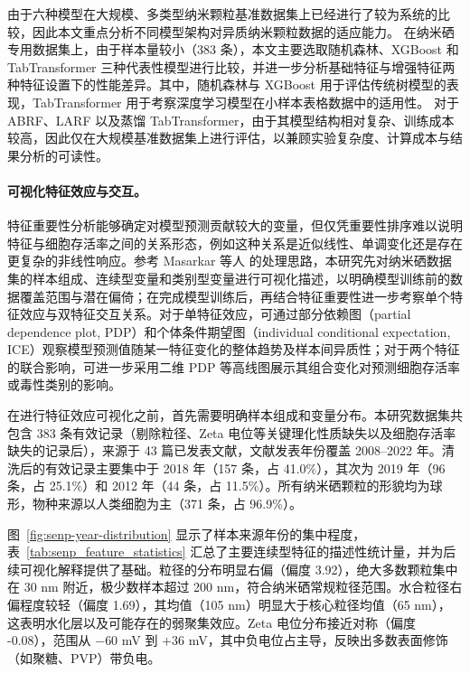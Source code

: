 由于六种模型在大规模、多类型纳米颗粒基准数据集上已经进行了较为系统的比较，因此本文重点分析不同模型架构对异质纳米颗粒数据的适应能力。
在纳米硒专用数据集上，由于样本量较小（383 条），本文主要选取随机森林、XGBoost 和 TabTransformer 三种代表性模型进行比较，并进一步分析基础特征与增强特征两种特征设置下的性能差异。其中，随机森林与 XGBoost 用于评估传统树模型的表现，TabTransformer 用于考察深度学习模型在小样本表格数据中的适用性。
对于 ABRF、LARF 以及蒸馏 TabTransformer，由于其模型结构相对复杂、训练成本较高，因此仅在大规模基准数据集上进行评估，以兼顾实验复杂度、计算成本与结果分析的可读性。

\paragraph{可视化特征效应与交互。}
特征重要性分析能够确定对模型预测贡献较大的变量，但仅凭重要性排序难以说明特征与细胞存活率之间的关系形态，例如这种关系是近似线性、单调变化还是存在更复杂的非线性响应。参考 Masarkar 等人 \cite{masarkar2024} 的处理思路，本研究先对纳米硒数据集的样本组成、连续型变量和类别型变量进行可视化描述，以明确模型训练前的数据覆盖范围与潜在偏倚；在完成模型训练后，再结合特征重要性进一步考察单个特征效应与双特征交互关系。对于单特征效应，可通过部分依赖图（partial dependence plot, PDP）和个体条件期望图（individual conditional expectation, ICE）观察模型预测值随某一特征变化的整体趋势及样本间异质性；对于两个特征的联合影响，可进一步采用二维 PDP 等高线图展示其组合变化对预测细胞存活率或毒性类别的影响。

在进行特征效应可视化之前，首先需要明确样本组成和变量分布。本研究数据集共包含 383 条有效记录（剔除粒径、Zeta 电位等关键理化性质缺失以及细胞存活率缺失的记录后），来源于 43 篇已发表文献，文献发表年份覆盖 2008--2022 年。清洗后的有效记录主要集中于 2018 年（157 条，占 41.0\%），其次为 2019 年（96 条，占 25.1\%）和 2012 年（44 条，占 11.5\%）。所有纳米硒颗粒的形貌均为球形，物种来源以人类细胞为主（371 条，占 96.9\%）。

图~\ref{fig:senp-year-distribution} 显示了样本来源年份的集中程度，表~\ref{tab:senp_feature_statistics} 汇总了主要连续型特征的描述性统计量，并为后续可视化解释提供了基础。粒径的分布明显右偏（偏度 3.92），绝大多数颗粒集中在 30 nm 附近，极少数样本超过 200 nm，符合纳米硒常规粒径范围。水合粒径右偏程度较轻（偏度 1.69），其均值（105 nm）明显大于核心粒径均值（65 nm），这表明水化层以及可能存在的弱聚集效应。Zeta 电位分布接近对称（偏度 -0.08），范围从 $-60$ mV 到 $+36$ mV，其中负电位占主导，反映出多数表面修饰（如聚糖、PVP）带负电。

